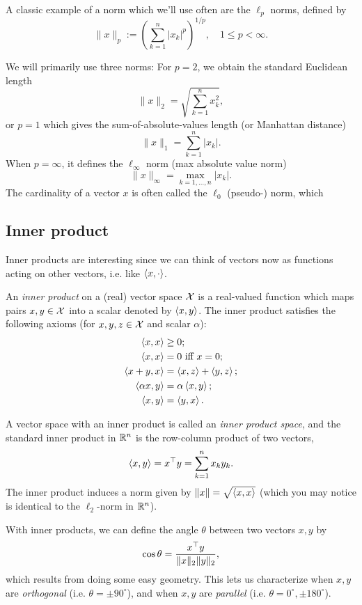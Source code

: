\documentclass[11 pt]{scrartcl}
\begin{document}
A classic example of a norm which we'll use often are the $\ell_p$ norms, defined by 
\[ \|x\|_p := \left(\sum_{k=1}^n |x_k|^p \right)^{1/p}, \quad 1\leq p < \infty.\] 

We will primarily use three norms: 
\itemnum
    \ii For $p=2$, we obtain the standard Euclidean length 
    \[ \|x\|_2 = \sqrt{\sum_{k=1}^n x_k^2},\] 
    \ii or $p=1$ which gives the sum-of-absolute-values length (or Manhattan distance) 
    \[ \|x\|_1 = \sum_{k=1}^n |x_k|.\] 
    \ii When $p=\infty$, it defines the $\ell_\infty$ norm (max absolute value norm) 
    \[ \|x\|_{\infty} = \max_{k=1,\dots, n} |x_k|.\] 
    \ii The cardinality of a vector $x$ is often called the $\ell_0$ (pseudo-) norm, which
\itemend

\subsection{Inner product}
Inner products are interesting since we can think of vectors now as functions acting on other vectors, i.e. like $\left\langle x, \cdot \right\rangle$. 
\begin{definition}
    An \emph{inner product} on a (real) vector space $\mathcal X$ is a real-valued function which maps pairs $x,y\in \mathcal X$ into a scalar denoted by $\left\langle x,y \right\rangle$. 
    The inner product satisfies the following axioms (for $x,y,z\in \mathcal X$ and scalar $\alpha$):
    \begin{align*}
        \left\langle x,x \right\rangle &\geq 0;  \\
        \left\langle x,x \right\rangle &= 0 \text{ iff } x = 0;  \\
        \left\langle x+y,x \right\rangle &= \left\langle x,z \right\rangle + \left\langle y,z \right\rangle;  \\
        \left\langle \alpha x,y \right\rangle &= \alpha \left\langle x,y \right\rangle;  \\
        \left\langle x,y \right\rangle &= \left\langle y,x \right\rangle.
    \end{align*}
\end{definition}

A vector space with an inner product is called an \emph{inner product space}, and the standard inner product in $\mathbb R^n$ is the row-column product of two vectors, 
\[ \left\langle x,y \right\rangle = x^\top y = \sum_{k=1}^n x_ky_k.\] 
The inner product induces a norm given by $\|x\| = \sqrt{\left\langle x,x \right\rangle}$ (which you may notice is identical to the $\ell_2$-norm in $\mathbb R^n$). 

With inner products, we can define the angle $\theta$ between two vectors $x,y$ by 
\[ \cos \theta = \dfrac{x^\top y}{\|x\|_2\|y\|_2},\]
which results from doing some easy geometry. 
This lets us characterize when $x,y$ are \emph{orthogonal} (i.e. $\theta = \pm 90^\circ$), and when $x,y$ are \emph{parallel} (i.e. $\theta = 0^\circ, \pm 180^\circ$). 
\end{document}
